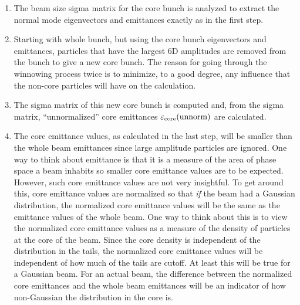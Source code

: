 \documentclass{hitec}
\newcommand{\unnorm}{\text{unnorm}}
\newcommand{\eps}{{\mathlarger\varepsilon}}
\newcommand{\core}{\text{core}}
\begin{document}
{{{{{{{{{{{{\begin{code}
{{{{{{{{{{{{{{{{{\begin{enumerate}
Particles with the largest 6D amplitudes are removed from the bunch to give a ``core'' bunch.
%
\item
The beam size sigma matrix for the core bunch is analyzed to extract the normal mode eigenvectors
and emittances exactly as in the first step.
%
\item
Starting with whole bunch, but using the core bunch eigenvectors and emittances, particles that have
the largest 6D amplitudes are removed from the bunch to give a new core bunch.  The reason for going
through the winnowing process twice is to minimize, to a good degree, any influence that the
non-core particles will have on the calculation.
%
\item
The sigma matrix of this new core bunch is computed and, from the sigma matrix, ``unnormalized''
core emittances $\eps_\core(\unnorm)$ are calculated.
%
\item
The core emittance values, as calculated in the last step, will be smaller than the whole beam
emittances since large amplitude particles are ignored. One way to think about emittance is that it
is a measure of the area of phase space a beam inhabits so smaller core emittance values are to be
expected.  However, such core emittance values are not very insightful. To get around this, core
emittance values are normalized so that {\em if} the beam had a Gaussian distribution, the
normalized core emittance values will be the same as the emittance values of the whole beam. One way
to think about this is to view the normalized core emittance values as a measure of the density of
particles at the core of the beam. Since the core density is independent of the distribution in the
tails, the normalized core emittance values will be independent of how much of the tails are cutoff.
At least this will be true for a Gaussian beam. For an actual beam, the difference between the
normalized core emittances and the whole beam emittances will be an indicator of how non-Gaussian
the distribution in the core is.
\end{enumerate}

}}}}}}}}}}}}}}}}}
\end{code}}}}}}}}}}}}}
\end{document}
